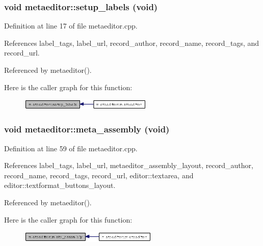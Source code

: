 \subsubsection{\setlength{\rightskip}{0pt plus 5cm}void metaeditor::setup\_\-labels (void)\hspace{0.3cm}{\tt  [private]}}\label{classmetaeditor_af5b1a4ed14a3d350eed20287955d080}




Definition at line 17 of file metaeditor.cpp.

References label\_\-tags, label\_\-url, record\_\-author, record\_\-name, record\_\-tags, and record\_\-url.

Referenced by metaeditor().

Here is the caller graph for this function:\begin{figure}[H]
\begin{center}
\leavevmode
\includegraphics[width=179pt]{classmetaeditor_af5b1a4ed14a3d350eed20287955d080_icgraph}
\end{center}
\end{figure}
\subsubsection{\setlength{\rightskip}{0pt plus 5cm}void metaeditor::meta\_\-assembly (void)\hspace{0.3cm}{\tt  [private]}}\label{classmetaeditor_2c597b9931b03aa043e71cf437da00cd}




Definition at line 59 of file metaeditor.cpp.

References label\_\-tags, label\_\-url, metaeditor\_\-assembly\_\-layout, record\_\-author, record\_\-name, record\_\-tags, record\_\-url, editor::textarea, and editor::textformat\_\-buttons\_\-layout.

Referenced by metaeditor().

Here is the caller graph for this function:\begin{figure}[H]
\begin{center}
\leavevmode
\includegraphics[width=187pt]{classmetaeditor_2c597b9931b03aa043e71cf437da00cd_icgraph}
\end{center}
\end{figure}


